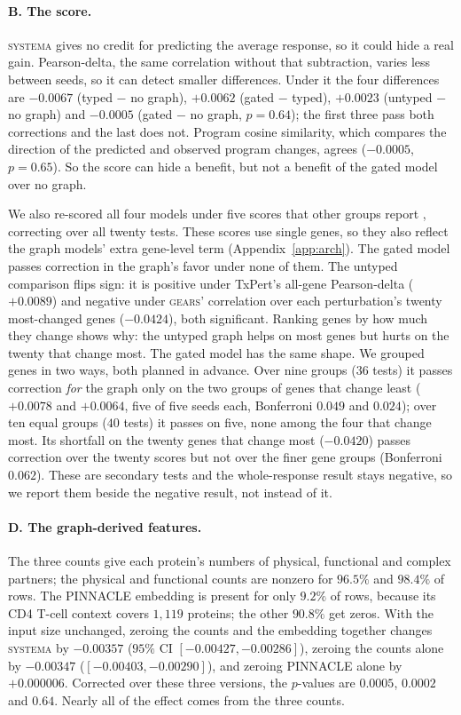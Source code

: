 \documentclass{article}
\begin{document}
\paragraph{B. The score.} \textsc{systema} gives no credit for predicting the average response, so it could
hide a real gain. Pearson-delta, the same correlation without that subtraction, varies less between seeds,
so it can detect smaller differences. Under it the four differences are $-0.0067$ (typed $-$ no graph),
$+0.0062$ (gated $-$ typed), $+0.0023$ (untyped $-$ no graph) and $-0.0005$ (gated $-$ no graph, $p=0.64$);
the first three pass both corrections and the last does not. Program cosine similarity, which compares the
direction of the predicted and observed program changes, agrees ($-0.0005$, $p=0.65$). So the score can
hide a benefit, but not a benefit of the gated model over no graph.

We also re-scored all four models under five scores that other groups report
\citep{roohani2024gears,wenkel2026txpert,peidli2024scperturb}, correcting over all twenty tests. These
scores use single genes, so they also reflect the graph models' extra gene-level term
(Appendix~\ref{app:arch}). The gated model passes correction in the graph's favor under none of them. The
untyped comparison flips sign: it is positive under TxPert's all-gene Pearson-delta ($+0.0089$) and
negative under \textsc{gears}' correlation over each perturbation's twenty most-changed genes ($-0.0424$),
both significant. Ranking genes by how much they change shows why: the untyped graph helps on most genes
but hurts on the twenty that change most. The gated model has the same shape. We grouped genes in two
ways, both planned in advance. Over nine groups ($36$ tests) it passes correction \emph{for} the graph only
on the two groups of genes that change least ($+0.0078$ and $+0.0064$, five of five seeds each, Bonferroni
$0.049$ and $0.024$); over ten equal groups ($40$ tests) it passes on five, none among the four that change
most. Its shortfall on the twenty genes that change most ($-0.0420$) passes correction over the twenty scores
but not over the finer gene groups (Bonferroni $0.062$). These are secondary tests and the
whole-response result stays negative, so we report them beside the negative result, not instead of it.

\paragraph{D. The graph-derived features.} The three counts give each protein's numbers of physical,
functional and complex partners; the physical and functional counts are nonzero for $96.5\%$ and $98.4\%$
of rows. The PINNACLE embedding is present for only $9.2\%$ of rows, because its CD4 T-cell context covers
$1{,}119$ proteins; the other $90.8\%$ get zeros. With the input size unchanged, zeroing the counts and the
embedding together changes \textsc{systema} by $-0.00357$ ($95\%$ CI $[-0.00427,-0.00286]$), zeroing the
counts alone by $-0.00347$ ($[-0.00403,-0.00290]$), and zeroing PINNACLE alone by $+0.000006$. Corrected
over these three versions, the $p$-values are $0.0005$, $0.0002$ and $0.64$. Nearly all of the effect comes
from the three counts.
\end{document}
